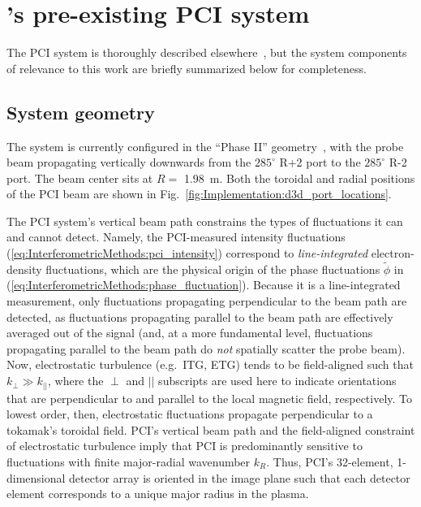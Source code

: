 \section{\diiid's pre-existing PCI system}
\label{sec:Implementation:PCI}
The \diiid \space PCI system is
thoroughly described elsewhere~\cite{dorris_rsi09, dorris_phd}, but
the system components of relevance to this work
are briefly summarized below for completeness.


\subsection{System geometry}
\label{sec:Implementation:PCI:geometry}
The system is currently configured
in the ``Phase II'' geometry~\cite{dorris_rsi09},
with the probe beam propagating vertically downwards
from the $285^{\circ}$ R+2 port to the $285^{\circ}$ R-2 port.
The beam center sits at $R = $ \SI{1.98}{\meter}.
Both the toroidal and radial positions
of the PCI beam are shown in
Fig.~\ref{fig:Implementation:d3d_port_locations}.

The PCI system's vertical beam path constrains
the types of fluctuations it can and cannot detect.
Namely, the PCI-measured intensity fluctuations
(\ref{eq:InterferometricMethods:pci_intensity})
correspond to \emph{line-integrated} electron-density fluctuations, which
are the physical origin of the phase fluctuations $\tilde{\phi}$ in
(\ref{eq:InterferometricMethods:phase_fluctuation}).
Because it is a line-integrated measurement,
only fluctuations propagating perpendicular to the beam path are detected,
as fluctuations propagating parallel to the beam path
are effectively averaged out of the signal
\graffito{\textcolor{red}{what about $\delta \omega$?}}
(and, at a more fundamental level, fluctuations propagating
parallel to the beam path do \emph{not} spatially scatter the probe beam).
\graffito{\textcolor{red}{citation? Wesson?}}
Now, electrostatic turbulence (e.g.\ ITG, ETG) tends to be field-aligned
such that $k_{\perp} \gg k_{||}$, where
the $\perp$ and $||$ subscripts are used here to indicate
orientations that are perpendicular to and parallel to
the local magnetic field, respectively.
To lowest order, then, electrostatic fluctuations propagate
perpendicular to a tokamak's toroidal field.
PCI's vertical beam path and
the field-aligned constraint of electrostatic turbulence
imply that PCI is predominantly sensitive to fluctuations
with finite major-radial wavenumber $k_R$.
Thus, PCI's 32-element, 1-dimensional detector array
is oriented in the image plane such that
each detector element corresponds to a unique major radius in the plasma.

